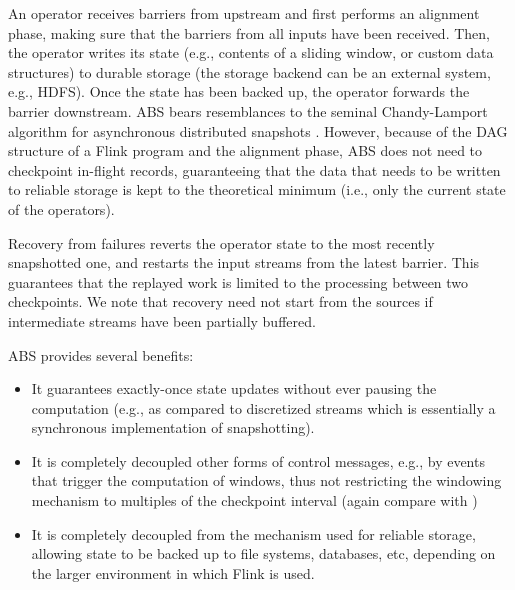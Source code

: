 An operator receives barriers from upstream and first performs an alignment phase, making sure that the barriers from all inputs have been received. Then, the operator writes its state (e.g., contents of a sliding window, or custom data structures) to durable storage (the storage backend can be an external system, e.g., HDFS). Once the state has been backed up, the operator forwards the barrier downstream. ABS bears resemblances to the seminal Chandy-Lamport algorithm for asynchronous distributed snapshots \cite{chandy1985distributed}. However, because of the DAG structure of a Flink program and the alignment phase, ABS does not need to checkpoint in-flight records, guaranteeing that the data that needs to be written to reliable storage is kept to the theoretical minimum (i.e., only the current state of the operators).


Recovery from failures reverts the operator state to the most recently snapshotted one, and restarts the input streams from the latest barrier. This guarantees that the replayed work is limited to the processing between two checkpoints. We note that recovery need not start from the sources if intermediate streams have been partially buffered.

\vspace{2mm}
\noindent ABS provides several benefits: 

\begin{itemize}
\item It guarantees exactly-once state updates without ever pausing the computation (e.g., as compared to discretized streams \cite{DBLP:conf/hotcloud/ZahariaCFSS10} which is essentially a synchronous implementation of snapshotting).
\item It is completely decoupled other forms of control messages, e.g., by events that trigger the computation of windows, thus not restricting the windowing mechanism to multiples of the checkpoint interval (again compare with \cite{DBLP:conf/hotcloud/ZahariaCFSS10})
\item It is completely decoupled from the mechanism used for reliable storage, allowing state to be backed up to file systems, databases, etc, depending on the larger environment in which Flink is used.
\end{itemize}


